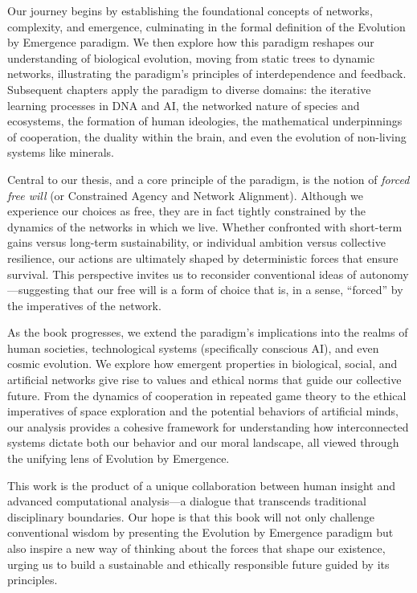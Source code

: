 \documentclass[12pt,openany]{book}
\begin{document}
Our journey begins by establishing the foundational concepts of networks, complexity, and emergence, culminating in the formal definition of the Evolution by Emergence paradigm. We then explore how this paradigm reshapes our understanding of biological evolution, moving from static trees to dynamic networks, illustrating the paradigm's principles of interdependence and feedback. Subsequent chapters apply the paradigm to diverse domains: the iterative learning processes in DNA and AI, the networked nature of species and ecosystems, the formation of human ideologies, the mathematical underpinnings of cooperation, the duality within the brain, and even the evolution of non-living systems like minerals. %

Central to our thesis, and a core principle of the paradigm, is the notion of \emph{forced free will} (or Constrained Agency and Network Alignment). Although we experience our choices as free, they are in fact tightly constrained by the dynamics of the networks in which we live. Whether confronted with short-term gains versus long-term sustainability, or individual ambition versus collective resilience, our actions are ultimately shaped by deterministic forces that ensure survival. This perspective invites us to reconsider conventional ideas of autonomy—suggesting that our free will is a form of choice that is, in a sense, “forced” by the imperatives of the network.

As the book progresses, we extend the paradigm's implications into the realms of human societies, technological systems (specifically conscious AI), and even cosmic evolution. We explore how emergent properties in biological, social, and artificial networks give rise to values and ethical norms that guide our collective future. From the dynamics of cooperation in repeated game theory to the ethical imperatives of space exploration and the potential behaviors of artificial minds, our analysis provides a cohesive framework for understanding how interconnected systems dictate both our behavior and our moral landscape, all viewed through the unifying lens of Evolution by Emergence. %

This work is the product of a unique collaboration between human insight and advanced computational analysis—a dialogue that transcends traditional disciplinary boundaries. Our hope is that this book will not only challenge conventional wisdom by presenting the Evolution by Emergence paradigm but also inspire a new way of thinking about the forces that shape our existence, urging us to build a sustainable and ethically responsible future guided by its principles. %
\end{document}

